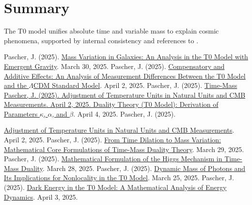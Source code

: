 \documentclass[a4paper,12pt]{article}
\theoremstyle{definition}
\theoremstyle{remark}
\begin{document}
	\section{Summary}
	
	The T0 model unifies absolute time and variable mass to explain cosmic phenomena, supported by internal consistency and references to \cite{pascher_galaxies_2025, pascher_params_2025, pascher_messdifferenzen_2025}.
	
	\begin{thebibliography}{99}
		 Pascher, J. (2025). \href{https://github.com/jpascher/T0-Time-Mass-Duality/tree/main/2/pdf/English/MassVarGalaxienEn.pdf}{Mass Variation in Galaxies: An Analysis in the T0 Model with Emergent Gravity}. March 30, 2025.
		 Pascher, J. (2025). \href{https://github.com/jpascher/T0-Time-Mass-Duality/tree/main/2/pdf/English/MessdifferenzenT0StandardEn.pdf}{Compensatory and Additive Effects: An Analysis of Measurement Differences Between the T0 Model and the \(\Lambda\)CDM Standard Model}. April 2, 2025.
		 Pascher, J. (2025). \href{https://github.com/jpascher/T0-Time-Mass-Duality/tree/main/2/pdf/English/ZeitMasseT0ParamsEn.pdf}{Time-Mass 
	 Pascher, J. (2025). \href{https://github.com/jpascher/T0-Time-Mass-Duality/tree/main/2/pdf/English/TempEinheitenCMBEn.pdf}{Adjustment of Temperature Units in Natural Units and CMB Measurements}. April 2, 2025.		
			Duality Theory (T0 Model): Derivation of Parameters \(\kappa\), \(\alpha\), and \(\beta\)}. April 4, 2025.
		 Pascher, J. (2025).
		
		 \href{https://github.com/jpascher/T0-Time-Mass-Duality/tree/main/2/pdf/English/NatEinheitenAlpha1En.pdf}{Adjustment of Temperature Units in Natural Units and CMB Measurements}. April 2, 2025.
		 Pascher, J. (2025). \href{https://github.com/jpascher/T0-Time-Mass-Duality/tree/main/2/pdf/English/MathZeitMasseLagrange.pdf}{From Time Dilation to Mass Variation: Mathematical Core Formulations of Time-Mass Duality Theory}. March 29, 2025.
		 Pascher, J. (2025). \href{https://github.com/jpascher/T0-Time-Mass-Duality/tree/main/2/pdf/English/MathHiggsZeitMasseEn.pdf}{Mathematical Formulation of the Higgs Mechanism in Time-Mass Duality}. March 28, 2025.
		 Pascher, J. (2025). \href{https://github.com/jpascher/T0-Time-Mass-Duality/tree/main/2/pdf/English/DynMassePhotonenNichtlokalEn.pdf}{Dynamic Mass of Photons and Its Implications for Nonlocality in the T0 Model}. March 25, 2025.
		 Pascher, J. (2025). \href{https://github.com/jpascher/T0-Time-Mass-Duality/tree/main/2/pdf/English/MathEnergiedynamikEn.pdf}{Dark Energy in the T0 Model: A Mathematical Analysis of Energy Dynamics}. April 3, 2025.
	\end{thebibliography}
	
\end{document}
